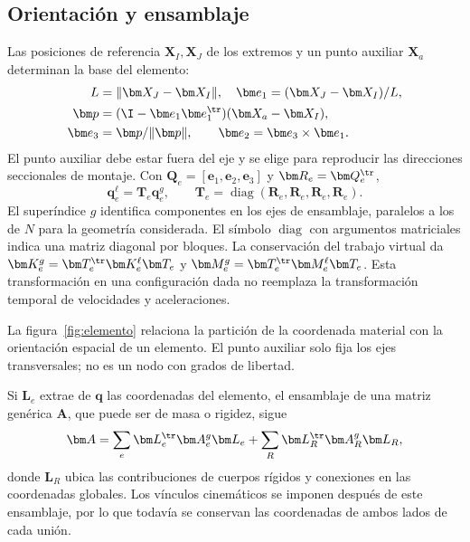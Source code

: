 \subsection{Orientación y ensamblaje}
Las posiciones de referencia $\bm X_I,\bm X_J$ de los extremos y un punto auxiliar $\bm X_a$ determinan la base del elemento:
\begin{align}
L&=\|\bm X_J-\bm X_I\|,\quad
\bm e_1=(\bm X_J-\bm X_I)/L,\nonumber\\
\bm p&=(\I-\bm e_1\bm e_1^\tr)(\bm X_a-\bm X_I),\nonumber\\
\bm e_3&=\bm p/\|\bm p\|,\qquad
\bm e_2=\bm e_3\times\bm e_1.
\label{eq:base-elemento}
\end{align}
El punto auxiliar debe estar fuera del eje y se elige para reproducir las direcciones seccionales de montaje. Con $\bm Q_e=[\bm e_1,\bm e_2,\bm e_3]$ y $\bm R_e=\bm Q_e^\tr$,
\begin{equation}
\bm q_e^\ell=\bm T_e\bm q_e^g,\qquad
\bm T_e=\operatorname{diag}(\bm R_e,\bm R_e,\bm R_e,\bm R_e).
\end{equation}
El superíndice $g$ identifica componentes en los ejes de ensamblaje, paralelos a los de $N$ para la geometría considerada. El símbolo $\operatorname{diag}$ con argumentos matriciales indica una matriz diagonal por bloques. La conservación del trabajo virtual da $\bm K_e^g=\bm T_e^\tr\bm K_e^\ell\bm T_e$ y $\bm M_e^g=\bm T_e^\tr\bm M_e^\ell\bm T_e$. Esta transformación en una configuración dada no reemplaza la transformación temporal de velocidades y aceleraciones.

La figura~\ref{fig:elemento} relaciona la partición de la coordenada material con la orientación espacial de un elemento. El punto auxiliar solo fija los ejes transversales; no es un nodo con grados de libertad.




Si $\bm L_e$ extrae de $\bm q$ las coordenadas del elemento, el ensamblaje de una matriz genérica $\bm A$, que puede ser de masa o rigidez, sigue
\begin{equation}
\bm A=\sum_e\bm L_e^\tr\bm A_e^g\bm L_e
+\sum_R\bm L_R^\tr\bm A_R^g\bm L_R,
\end{equation}
donde $\bm L_R$ ubica las contribuciones de cuerpos rígidos y conexiones en las coordenadas globales. Los vínculos cinemáticos se imponen después de este ensamblaje, por lo que todavía se conservan las coordenadas de ambos lados de cada unión.


